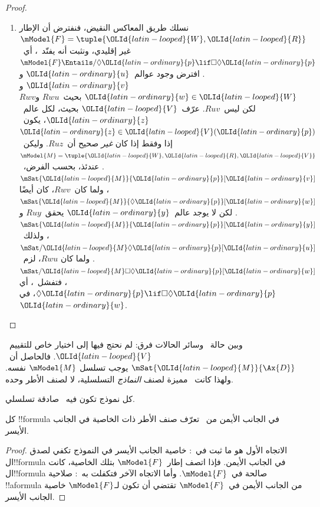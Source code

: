 \documentclass[../../../include/open-logic-section]{subfiles}
\begin{document}
\begin{proof}
\begin{enumerate}
    $\mSat{\OLId{latin-looped}{M}}{\OLId{latin-ordinary}{p}}[\OLId{latin-ordinary}{w}]$؛ وبتعريف~$\OLId{latin-looped}{V}$ لا يمكن هذا إلا إذا كان~$Ruw$، كما
    أُريد.
  \item نسلك طريق المعاكس النقيض، فنفترض أن الإطار
    $\mModel{F} = \tuple{\OLId{latin-looped}{W}, \OLId{latin-looped}{R}}$ غير إقليدي، ونثبت أنه يفنّد~،
    أي~$\mModel{F} \Entails/ \Diamond \OLId{latin-ordinary}{p} \lif \Box\Diamond \OLId{latin-ordinary}{p}$. افترض
    وجود عوالم~$\OLId{latin-ordinary}{u}$ و$\OLId{latin-ordinary}{v}$ و$\OLId{latin-ordinary}{w} \in \OLId{latin-looped}{W}$ بحيث~$Rwu$ و$Rwv$ لكن ليس~$Ruv$.
    عرّف~$\OLId{latin-looped}{V}$ بحيث، لكل عالم~$\OLId{latin-ordinary}{z}$، يكون~$\OLId{latin-ordinary}{z} \in \OLId{latin-looped}{V}(\OLId{latin-ordinary}{p})$ إذا وفقط إذا كان
    \emph{غير} صحيح أن~$Ruz$. وليكن~$\mModel{M} =\tuple{\OLId{latin-looped}{W}, \OLId{latin-looped}{R}, \OLId{latin-looped}{V}}$.
    عندئذ، بحسب الفرض،~$\mSat{\OLId{latin-looped}{M}}{\OLId{latin-ordinary}{p}}[\OLId{latin-ordinary}{v}]$، ولما كان~$Rwv$، كان أيضًا
    $\mSat{\OLId{latin-looped}{M}}{\Diamond \OLId{latin-ordinary}{p}}[\OLId{latin-ordinary}{w}]$. لكن لا يوجد عالم~$\OLId{latin-ordinary}{y}$ يحقق~$Ruy$ و
    $\mSat{\OLId{latin-looped}{M}}{\OLId{latin-ordinary}{p}}[\OLId{latin-ordinary}{y}]$، ولذلك~$\mSat/{\OLId{latin-looped}{M}}{\Diamond \OLId{latin-ordinary}{p}}[\OLId{latin-ordinary}{u}]$. ولما كان
    $Rwu$، لزم~$\mSat/{\OLId{latin-looped}{M}}{\Box\Diamond \OLId{latin-ordinary}{p}}[\OLId{latin-ordinary}{w}]$، فتفشل~، أي
    $\Diamond \OLId{latin-ordinary}{p} \lif \Box\Diamond \OLId{latin-ordinary}{p}$، في~$\OLId{latin-ordinary}{w}$.
  \end{enumerate}
\end{proof}

وبين حالة~ وسائر الحالات فرق: لم نحتج فيها إلى اختيار خاص
للتقييم~$\OLId{latin-looped}{V}$. فالحاصل أن~$\mSat{\OLId{latin-looped}{M}}{\Ax{D}}$ يوجب تسلسل
$\mModel{M}$ نفسه. ولهذا كانت~ مميزة لصنف \emph{النماذج}
التسلسلية، لا لصنف الأطر وحده.

\begin{cor}
  كل نموذج تكون فيه~ صادقة تسلسلي.
\end{cor}

\begin{cor}
كل !!{formula} في الجانب الأيمن من~ تعرّف صنف
الأطر ذات الخاصية في الجانب الأيسر.
\end{cor}

\begin{proof}
  الاتجاه الأول هو ما ثبت في~:
  خاصية الجانب الأيسر في النموذج تكفي لصدق ال!!{formula}
  في الجانب الأيمن. فإذا اتصف إطار~$\mModel{F}$ بتلك الخاصية،
  كانت ال!!{formula} صالحة في~$\mModel{F}$.
  وأما الاتجاه الآخر فتكفلت به~:
  صلاحية !!a{formula} من الجانب الأيمن في~$\mModel{F}$
  تقتضي أن تكون لـ$\mModel{F}$ خاصية الجانب الأيسر.
\end{proof}
\end{document}

